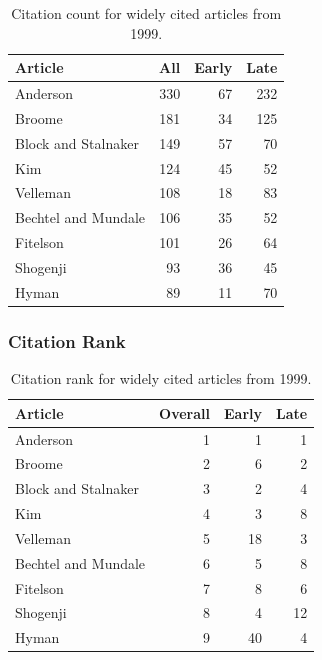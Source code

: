 \documentclass[
  10pt,
  letterpaper,
  DIV=11,
  numbers=noendperiod,
  twoside]{scrartcl}
\begin{document}
\begin{longtable}[]{@{}lrrr@{}}

\caption{\label{tbl-citation-count-1999}Citation count for widely cited
articles from 1999.}

\tabularnewline

\toprule\noalign{}
Article & All & Early & Late \\
\midrule\noalign{}
\endhead
\bottomrule\noalign{}
\endlastfoot
Anderson & 330 & 67 & 232 \\
Broome & 181 & 34 & 125 \\
Block and Stalnaker & 149 & 57 & 70 \\
Kim & 124 & 45 & 52 \\
Velleman & 108 & 18 & 83 \\
Bechtel and Mundale & 106 & 35 & 52 \\
Fitelson & 101 & 26 & 64 \\
Shogenji & 93 & 36 & 45 \\
Hyman & 89 & 11 & 70 \\

\end{longtable}

\subsubsection*{Citation Rank}\label{sec-rank-1999}

\begin{longtable}[]{@{}lrrr@{}}

\caption{\label{tbl-citation-rank-1999}Citation rank for widely cited
articles from 1999.}

\tabularnewline

\toprule\noalign{}
Article & Overall & Early & Late \\
\midrule\noalign{}
\endhead
\bottomrule\noalign{}
\endlastfoot
Anderson & 1 & 1 & 1 \\
Broome & 2 & 6 & 2 \\
Block and Stalnaker & 3 & 2 & 4 \\
Kim & 4 & 3 & 8 \\
Velleman & 5 & 18 & 3 \\
Bechtel and Mundale & 6 & 5 & 8 \\
Fitelson & 7 & 8 & 6 \\
Shogenji & 8 & 4 & 12 \\
Hyman & 9 & 40 & 4 \\

\end{longtable}
\end{document}
